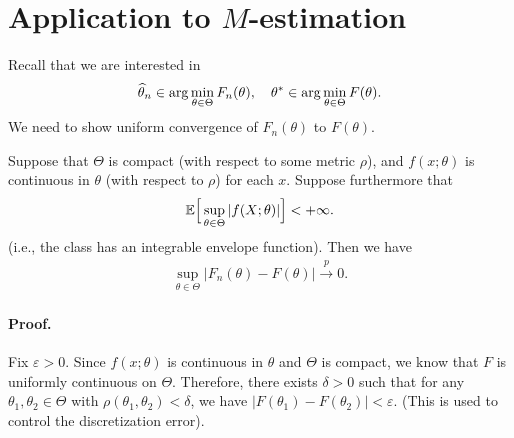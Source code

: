 \documentclass[11pt,letterpaper]{article}
\numberwithin{theorem}{lecture}
\numberwithin{proposition}{lecture}
\numberwithin{lemma}{lecture}
\numberwithin{claim}{lecture}
\numberwithin{corollary}{lecture}
\numberwithin{definition}{lecture}
\numberwithin{conjecture}{lecture}
\numberwithin{remark}{lecture}
\numberwithin{example}{lecture}
\numberwithin{equation}{lecture}
\begin{document}
\section{Application to $M$-estimation}
Recall that we are interested in
\begin{align*}
  \widehat{\theta}_n \in \arg\min_{\theta \in \Theta} F_n (\theta), \quad \theta^* \in \arg\min_{\theta \in \Theta} F (\theta).
\end{align*}
We need to show uniform convergence of $F_n (\theta)$ to $F (\theta)$.
\begin{theorem}[Wald]
  Suppose that $\Theta$ is compact (with respect to some metric $\rho$), and $f (x; \theta)$ is continuous in $\theta$ (with respect to $\rho$) for each $x$. Suppose furthermore that
  \begin{align*}
    {\mathbb{E}} \Big[ \sup_{\theta \in \Theta} |f (X; \theta)| \Big] < + \infty.
  \end{align*}
  (i.e., the class has an integrable envelope function). Then we have
  \begin{align*}
    \sup_{\theta \in \Theta} |F_n (\theta) - F (\theta)| \xrightarrow{p} 0.
  \end{align*}
\end{theorem}

\paragraph{Proof.} Fix $\varepsilon > 0$. Since $f (x; \theta)$ is continuous in $\theta$ and $\Theta$ is compact, we know that $F$ is uniformly continuous on $\Theta$. Therefore, there exists $\delta > 0$ such that for any $\theta_1, \theta_2 \in \Theta$ with $\rho(\theta_1, \theta_2) < \delta$, we have $|F (\theta_1) - F (\theta_2)| < \varepsilon$. (This is used to control the discretization error).
\end{document}
